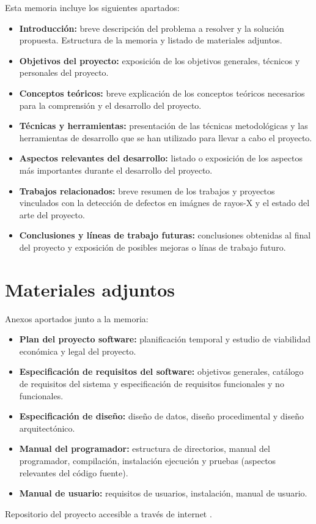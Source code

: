 Esta memoria incluye los siguientes apartados:

\begin{itemize}
    \item \textbf{Introducción:} breve descripción del problema a resolver y la solución propuesta. Estructura de la memoria y listado de materiales adjuntos.
    \item \textbf{Objetivos del proyecto:} exposición de los    objetivos generales, técnicos y personales del proyecto.
    \item \textbf{Conceptos teóricos:} breve explicación de los conceptos teóricos necesarios para la comprensión y el desarrollo del proyecto.
    \item \textbf{Técnicas y herramientas:} presentación de las técnicas metodológicas y las herramientas de desarrollo que se han utilizado para llevar a cabo el proyecto.
    \item \textbf{Aspectos relevantes del desarrollo:} listado o exposición de los aspectos más importantes durante el desarrollo del proyecto.
    \item \textbf{Trabajos relacionados:} breve resumen de los trabajos y proyectos vinculados con la detección de defectos en imágnes de rayos-X y el estado del arte del proyecto.
    \item \textbf{Conclusiones y líneas de trabajo futuras:} conclusiones obtenidas al final del proyecto y exposición de posibles mejoras o línas de trabajo futuro.
\end{itemize}

\section{Materiales adjuntos}

Anexos aportados junto a la memoria:

\begin{itemize}
    \item \textbf{Plan del proyecto software:} planificación temporal y estudio de viabilidad económica y legal del proyecto.
    \item \textbf{Especificación de requisitos del software:} objetivos generales, catálogo de requisitos del sistema y especificación de requisitos funcionales y no funcionales.
    \item \textbf{Especificación de diseño:} diseño de datos, diseño procedimental y diseño arquitectónico.
    \item \textbf{Manual del programador:} estructura de directorios, manual del programador, compilación, instalación ejecución y pruebas (aspectos relevantes del código fuente).
    \item \textbf{Manual de usuario:} requisitos de usuarios, instalación, manual de usuario.
\end{itemize}

Repositorio del proyecto accesible a través de internet \cite{XRayDetector:repositorio}.